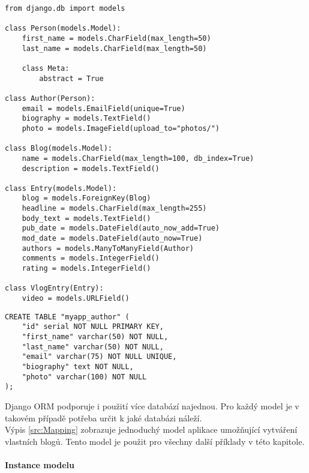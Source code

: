 \documentclass[ing,male,java,dept456]{diploma}						%
\begin{document}
\begin{lstlisting}[style=custompython, emph={ Blog, Person, Author, Entry, VlogEntry}, emphstyle={\bfseries}, label=src:Mapping, caption=Modely jednoduché aplikace pro vytváření blogů]
from django.db import models

class Person(models.Model):
    first_name = models.CharField(max_length=50)
    last_name = models.CharField(max_length=50)

    class Meta:
        abstract = True

class Author(Person):
    email = models.EmailField(unique=True)
    biography = models.TextField()
    photo = models.ImageField(upload_to="photos/")

class Blog(models.Model):
    name = models.CharField(max_length=100, db_index=True)
    description = models.TextField()

class Entry(models.Model):
    blog = models.ForeignKey(Blog)
    headline = models.CharField(max_length=255)
    body_text = models.TextField()
    pub_date = models.DateField(auto_now_add=True)
    mod_date = models.DateField(auto_now=True)
    authors = models.ManyToManyField(Author)
    comments = models.IntegerField()
    rating = models.IntegerField()

class VlogEntry(Entry):
    video = models.URLField()

\end{lstlisting}

\begin{lstlisting}[label=src:SQLAuthorMapping, caption=Reprezentace modelu Author v PostgreSQL, style=customsql]
CREATE TABLE "myapp_author" (
    "id" serial NOT NULL PRIMARY KEY,
    "first_name" varchar(50) NOT NULL,
    "last_name" varchar(50) NOT NULL,
    "email" varchar(75) NOT NULL UNIQUE,
    "biography" text NOT NULL,
    "photo" varchar(100) NOT NULL
);
\end{lstlisting}

Django ORM podporuje i použití více databází najednou. Pro každý model je v takovém případě potřeba určit k jaké databázi náleží. \\
Výpis \ref{src:Mapping} zobrazuje jednoduchý model aplikace umožňující vytváření vlastních blogů. Tento model je použit pro všechny další příklady v této kapitole.

\paragraph{Instance modelu}
\end{document}
